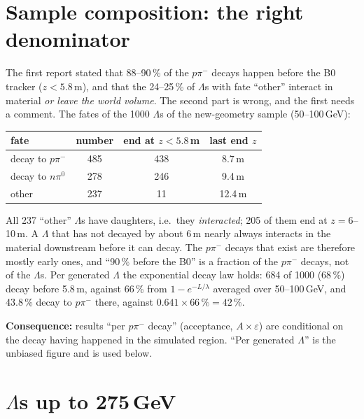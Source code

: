 \documentclass[11pt,a4paper]{article}
\begin{document}
\section{Sample composition: the right denominator}
\label{sec:fates}

The first report stated that 88--90\,\% of the $p\pi^-$ decays happen before the B0 tracker
($z < 5.8$\,m), and that the 24--25\,\% of $\Lambda$s with fate ``other'' interact in material
\emph{or leave the world volume}. The second part is wrong, and the first needs a comment. The
fates of the 1000 $\Lambda$s of the new-geometry sample (50--100\,GeV):

\begin{table}[H]
\centering
\begin{tabular}{@{}lccc@{}}
\toprule
fate & number & end at $z < 5.8$\,m & last end $z$\\
\midrule
decay to $p\pi^-$ & 485 & 438 & 8.7\,m\\
decay to $n\pi^0$ & 278 & 246 & 9.4\,m\\
other & 237 & 11 & 12.4\,m\\
\bottomrule
\end{tabular}
\end{table}

All 237 ``other'' $\Lambda$s have daughters, i.e.\ they \emph{interacted}; 205 of them end at
$z = 6$--10\,m. A $\Lambda$ that has not decayed by about 6\,m nearly always interacts in the
material downstream before it can decay. The $p\pi^-$ decays that exist are therefore mostly early
ones, and ``90\,\% before the B0'' is a fraction of the $p\pi^-$ decays, not of the $\Lambda$s.
Per generated $\Lambda$ the exponential decay law holds: 684 of 1000 (68\,\%) decay before
5.8\,m, against 66\,\% from $1 - e^{-L/\lambda}$ averaged over 50--100\,GeV, and 43.8\,\% decay
to $p\pi^-$ there, against $0.641 \times 66\,\% = 42\,\%$.

\textbf{Consequence:} results ``per $p\pi^-$ decay'' (acceptance, $A\times\varepsilon$) are
conditional on the decay having happened in the simulated region. ``Per generated $\Lambda$'' is
the unbiased figure and is used below.

\section{$\Lambda$s up to 275\,GeV}
\end{document}
